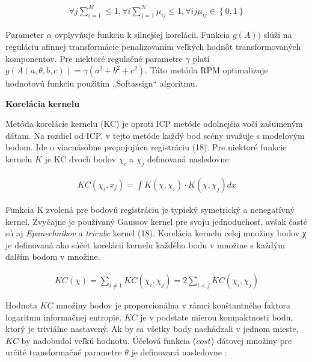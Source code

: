 \begin{equation}
\label{eq13}
\begin{aligned}
\forall j \sum_{i=1}^{M} \leq 1, \forall i \sum_{j=1}^{N} \mu_{ij} \leq 1, \forall ij \mu_{ij} \in \left\lbrace 0,1 \right\rbrace 
\end{aligned}
\end{equation}

Parameter $\alpha$ ovplyvňuje funkciu k silnejšej korelácii. Funkcia $g\left(A\right))$ slúži na reguláciu afinnej transformácie penalizovaním veľkých hodnôt transformovaných komponentov. Pre niektoré regulačné parametre $\gamma$ platí $g\left(A\left(a, \theta, b, c\right)\right) = \gamma \left(a^2 + b^2 + c^2 \right)$. Táto metóda RPM optimalizuje hodnotovú funkciu použitím „Softassign“ algoritmu.

\textbf{Korelácia kernelu}

Metóda korelácie kernelu (KC) je oproti ICP metóde odolnejšia vočí zašumeným dátam. Na rozdiel od ICP, v tejto metóde každý bod scény uvažuje s modelovým bodom. Ide o viacnásobne prepojujúcu registráciu (18). Pre niektoré funkcie kernelu $K$ je KC dvoch bodov $\chi_i$ a $\chi_j$ definovaná nasledovne:

\begin{equation}
\label{eq14}
\begin{aligned}
KC\left(\chi_i,x_j\right)=\int K\left(\chi,\chi_i\right) \cdot K\left(\chi,\chi_j\right) dx 
\end{aligned}
\end{equation}

Funkcia K zvolená pre bodovú registráciu je typický symetrický a nenegatívný kernel. Zvyčajne je používaný Gaussov kernel pre svoju jednoduchosť, avšak časté sú aj \textit{Epanechnikov} a \textit{tricube} kernel (18). Korelácia kernelu celej množiny bodov χ je definovaná ako súčet korelácií kernelu každého bodu v množine s každým ďalším bodom v množine.


\begin{equation}
\label{eq15}
\begin{aligned}
KC\left(\chi\right) = \sum_{i\ne1} KC\left(\chi_i,\chi_j\right)=2\sum_{i<j} KC\left(\chi_i,\chi_j\right)
\end{aligned}
\end{equation}

Hodnota $KC$ množiny bodov je proporcionálna v rámci konštantného faktora logaritmu informačnej entropie. $KC$ je v podstate mierou kompaktnosti bodu, ktorý je triviálne nastavený. Ak by sa všetky body nachádzali v jednom mieste, $KC$ by nadobudol veľkú hodnotu. Účelová funkcia ($cost$) dátovej množiny pre určité transformačné parametre $\theta$ je definovaná nasledovne :


